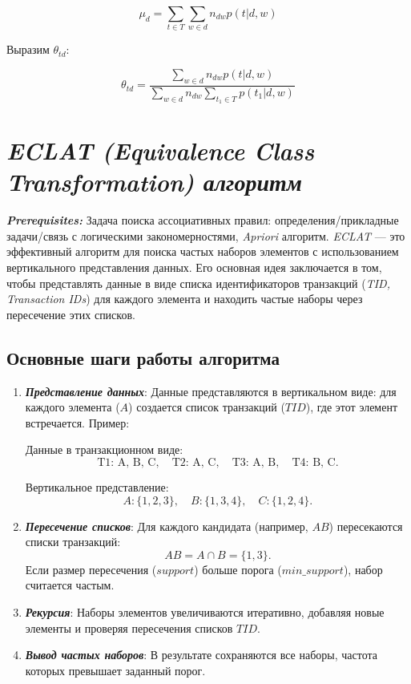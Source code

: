 $$\mu_{d} = \sum_{t \in T} \sum_{w \in d} n_{dw} p(t|d,w)$$

Выразим $\theta_{td}$:

$$\theta_{td} = \frac{\sum_{w \in d} n_{dw} p(t|d,w)}{\sum_{w \in d} n_{dw} \sum_{t_{1} \in T} p(t_{1}|d,w)}$$


\section{\textbf{\textit{ECLAT (Equivalence Class Transformation) алгоритм}}}
\textbf{\textit{Prerequisites:}} Задача поиска ассоциативных правил: определения/прикладные задачи/связь с логическими закономерностями, \textit{Apriori} алгоритм.\newline\newline
\textit{ECLAT} — это эффективный алгоритм для поиска частых наборов элементов с использованием вертикального представления данных. Его основная идея заключается в том, чтобы представлять данные в виде списка идентификаторов транзакций (\textit{TID, Transaction IDs}) для каждого элемента и находить частые наборы через пересечение этих списков.

\subsection{\textbf{Основные шаги работы алгоритма}}
\begin{enumerate}
    \item {\textbf{\textit{Представление данных}}:\newline
          Данные представляются в вертикальном виде: для каждого элемента (\(A\)) создается список транзакций (\(TID\)), где этот элемент встречается.\newline
          Пример:\par
          Данные в транзакционном виде:
          \[
              \text{T1: A, B, C}, \quad \text{T2: A, C}, \quad \text{T3: A, B}, \quad \text{T4: B, C}.
          \]  \par
          Вертикальное представление:
          \[
              A: \{1, 2, 3\}, \quad B: \{1, 3, 4\}, \quad C: \{1, 2, 4\}.
          \]}
    \item {\textbf{\textit{Пересечение списков}}:\newline
          Для каждого кандидата (например, \(AB\)) пересекаются списки транзакций:
          \[
              AB = A \cap B = \{1, 3\}.
          \]\newline
          Если размер пересечения (\(support\)) больше порога (\(min\_support\)), набор считается частым.}
    \item {\textbf{\textit{Рекурсия}}:\newline
          Наборы элементов увеличиваются итеративно, добавляя новые элементы и проверяя пересечения списков \(TID\).}
    \item {\textbf{\textit{Вывод частых наборов}}:\newline
          В результате сохраняются все наборы, частота которых превышает заданный порог.}
\end{enumerate}

